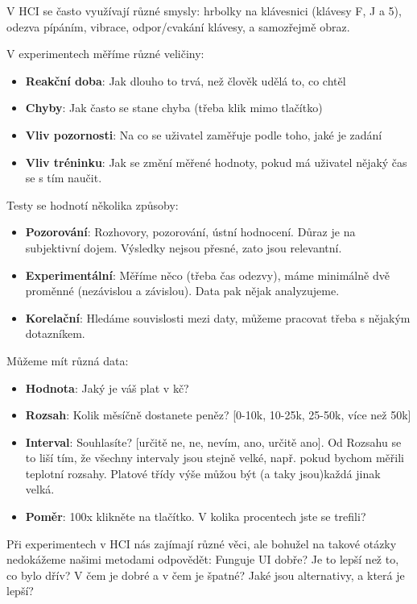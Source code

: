 V HCI se často využívají různé smysly: hrbolky na klávesnici (klávesy F, J a 5), odezva pípáním, vibrace, odpor/cvakání klávesy, a samozřejmě obraz.

\noindent V experimentech měříme různé veličiny:
\begin{itemize}
\item \textbf{Reakční doba}: Jak dlouho to trvá, než člověk udělá to, co chtěl
\item \textbf{Chyby}: Jak často se stane chyba (třeba klik mimo tlačítko)
\item \textbf{Vliv pozornosti}: Na co se uživatel zaměřuje podle toho, jaké je zadání
\item \textbf{Vliv tréninku}: Jak se změní měřené hodnoty, pokud má uživatel nějaký čas se s tím naučit.
\end{itemize}

\noindent Testy se hodnotí několika způsoby:

\begin{itemize}
\item \textbf{Pozorování}: Rozhovory, pozorování, ústní hodnocení. Důraz je na subjektivní dojem. Výsledky nejsou přesné, zato jsou relevantní.
\item \textbf{Experimentální}: Měříme něco (třeba čas odezvy), máme minimálně dvě proměnné (nezávislou a závislou). Data pak nějak analyzujeme.
\item \textbf{Korelační}: Hledáme souvislosti mezi daty, můžeme pracovat třeba s nějakým dotazníkem.
\end{itemize}

\noindent Můžeme mít různá data:

\begin{itemize}
\item \textbf{Hodnota}: Jaký je váš plat v kč?
\item \textbf{Rozsah}: Kolik měsíčně dostanete peněz? [0-10k, 10-25k, 25-50k, více než 50k]
\item \textbf{Interval}: Souhlasíte? [určitě ne, ne, nevím, ano, určitě ano]. Od Rozsahu se to liší tím, že všechny intervaly jsou stejně velké, např. pokud bychom měřili teplotní rozsahy. Platové třídy výše můžou být (a taky jsou)každá jinak velká.
\item \textbf{Poměr}: 100x klikněte na tlačítko. V kolika procentech jste se trefili?
\end{itemize}

Při experimentech v HCI nás zajímají různé věci, ale bohužel na takové otázky nedokážeme našimi metodami odpovědět: Funguje UI dobře? Je to lepší než to, co bylo dřív? V čem je dobré a v čem je špatné? Jaké jsou alternativy, a která je lepší?

